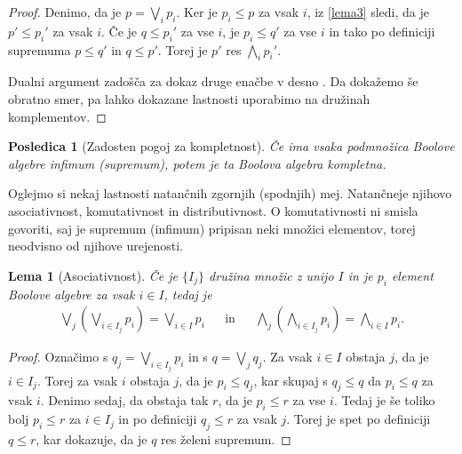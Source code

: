 \documentclass{amsart}
\newtheorem{lema}[izrek]{Lema}
\newtheorem{posledica}[izrek]{Posledica}
\begin{document}
\begin{proof}
    Denimo, da je \(p = \bigvee_{i} p_i\). Ker je \(p_i \leq p\) za vsak $i$, iz \ref{lema3} sledi, da je \(p' \leq p_i'\) za vsak $i$.
    Če je \(q \leq p_i'\) za vse $i$, je \(p_i \leq q'\) za vse $i$ in tako po definiciji supremuma \(p \leq q'\) in \(q \leq p'\). 
    Torej je $p'$ res \(\bigwedge_{i} p_i'\).

    Dualni argument zadošča za dokaz druge enačbe v desno . Da dokažemo še obratno smer, pa lahko dokazane lastnosti uporabimo na družinah komplementov.

\end{proof}

\begin{posledica}[Zadosten pogoj za kompletnost]
    Če ima vsaka podmnožica Boolove algebre infimum (supremum), potem je ta Boolova algebra kompletna.
\end{posledica}

    

Oglejmo si nekaj lastnosti natančnih zgornjih (spodnjih) mej. Natančneje njihovo asociativnost, komutativnost
in distributivnost. O komutativnosti ni smisla govoriti, saj je supremum (infimum) pripisan neki množici elementov, torej neodvisno od njihove urejenosti.

\begin{lema}[Asociativnost]
    Če je \(\{I_j\}\) družina množic z unijo \(I\) in je \(p_i\) element Boolove algebre za vsak \(i \in I\), tedaj je
    \begin{align*}
        \bigvee_{j}\left(\bigvee_{i \in I_j} p_i\right) = \bigvee_{i \in I} p_i && \text{in} && \bigwedge_{j}\left(\bigwedge_{i \in I_j} p_i\right) = \bigwedge_{i \in I} p_i.
    \end{align*}
\end{lema}

\begin{proof}
    Označimo s \(q_j = \bigvee_{i \in I_j} p_i\) in s \(q = \bigvee_j q_j\).
    Za vsak \(i \in I\) obstaja \(j\), da je \(i \in I_j\). Torej za vsak \(i\)
    obstaja \(j\), da je \(p_i \leq q_j\), kar skupaj s \(q_j \leq q\) da \(p_i \leq q\) za vsak \(i\).
    Denimo sedaj, da obstaja tak \(r\), da je \(p_i \leq r\) za vse \(i\). Tedaj je še toliko bolj
    \(p_i \leq r\) za \(i \in I_j\) in po definiciji \(q_j \leq r\) za vsak \(j\).
    Torej je spet po definiciji \(q \leq r\), kar dokazuje, da je \(q\) res želeni supremum.

\end{proof}
\end{document}
